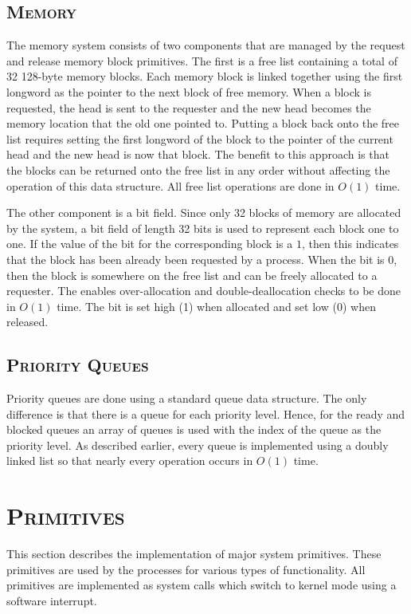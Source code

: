 \documentclass[oneside]{report}
\begin{document}
\subsection{\textsc{Memory}}
\label{sec:mem_management}
The memory system consists of two components that are managed by the request
and release memory block primitives. The first is a free list containing a
total of 32 128-byte memory blocks. Each memory block is linked together using
the first longword as the pointer to the next block of free memory. When a block is
requested, the head is sent to the requester and the new head becomes the
memory location that the old one pointed to. Putting a block back onto the free
list requires setting the first longword of the block to the pointer of the current
head and the new head is now that block. The benefit to this approach is that
the blocks can be returned onto the free list in any order without affecting
the operation of this data structure. All free list operations are done in
$O(1)$ time.

The other component is a bit field. Since only 32 blocks of memory are
allocated by the system, a bit field of length 32 bits is used to represent
each block one to one. If the value of the bit for the corresponding block is a
$1$, then this indicates that the block has been already been requested by a
process. When the bit is $0$, then the block is somewhere on the free list and
can be freely allocated to a requester. The enables over-allocation and
double-deallocation checks to be done in $O(1)$ time. The bit is set high (1)
when allocated and set low (0) when released.

\subsection{\textsc{Priority Queues}}
Priority queues are done using a standard queue data structure. The only
difference is that there is a queue for each priority level. Hence, for the
ready and blocked queues an array of queues is used with the index of the queue
as the priority level. As described earlier, every queue is implemented using a
doubly linked list so that nearly every operation occurs in $O(1)$ time.

\pagebreak

\section{\textsc{Primitives}}
\label{sec:primitives}
This section describes the implementation of major system primitives. These 
primitives are used by the processes for various types of functionality. All 
primitives are implemented as system calls which switch to kernel mode using a 
software interrupt.
\end{document}
